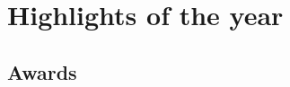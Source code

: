

\section{Highlights of the year}
\label{DIVERSE:highlights}

\subsection{Awards}
\label{DIVERSE:highlights-awards}
